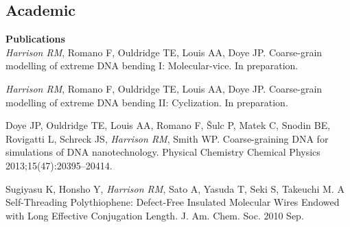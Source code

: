 \documentclass[margin]{res}
\begin{document}
\begin{sloppypar}
\begin{resume}
%


\section{Academic}

\textbf{Publications} \\
\textit{Harrison RM}, Romano F, Ouldridge TE, Louis AA, Doye JP. Coarse-grain modelling of extreme DNA bending I: Molecular-vice. In preparation.

\textit{Harrison RM}, Romano F, Ouldridge TE, Louis AA, Doye JP. Coarse-grain modelling of extreme DNA bending II: Cyclization. In preparation.

Doye JP, Ouldridge TE, Louis AA, Romano F, \v{S}ulc P, Matek C, Snodin BE, Rovigatti L, Schreck JS, \textit{Harrison RM}, Smith WP. Coarse-graining DNA for simulations of DNA nanotechnology. Physical Chemistry Chemical Physics 2013;15(47):20395--20414.

Sugiyasu K, Honsho Y, \textit{Harrison RM}, Sato A, Yasuda T, Seki S, Takeuchi M. A Self-Threading Polythiophene: Defect-Free Insulated Molecular Wires Endowed with Long Effective Conjugation Length. J. Am. Chem. Soc. 2010 Sep.



\end{resume}
\end{sloppypar}
\end{document}
